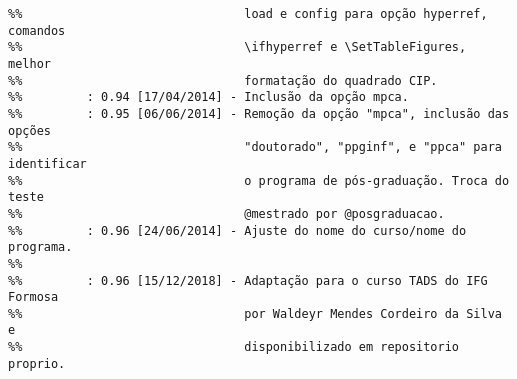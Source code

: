 \begin{verbatim}
%%                               load e config para opção hyperref, comandos
%%                               \ifhyperref e \SetTableFigures, melhor
%%                               formatação do quadrado CIP. 
%%         : 0.94 [17/04/2014] - Inclusão da opção mpca. 
%%         : 0.95 [06/06/2014] - Remoção da opção "mpca", inclusão das opções
%%                               "doutorado", "ppginf", e "ppca" para identificar
%%                               o programa de pós-graduação. Troca do teste 
%%                               @mestrado por @posgraduacao.
%%         : 0.96 [24/06/2014] - Ajuste do nome do curso/nome do programa.
%%
%%         : 0.96 [15/12/2018] - Adaptação para o curso TADS do IFG Formosa 
%%                               por Waldeyr Mendes Cordeiro da Silva e 
%%                               disponibilizado em repositorio proprio.
\end{verbatim}